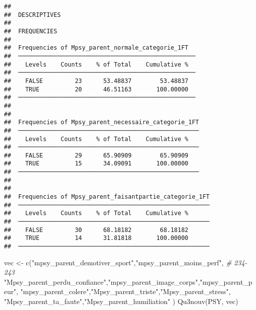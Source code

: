 \documentclass[
]{article}
\newenvironment{Shaded}{\begin{snugshade}}{\end{snugshade}}
\newcommand{\CommentTok}[1]{\textcolor[rgb]{0.56,0.35,0.01}{\textit{#1}}}
\newcommand{\FunctionTok}[1]{\textcolor[rgb]{0.00,0.00,0.00}{#1}}
\newcommand{\NormalTok}[1]{#1}
\newcommand{\OtherTok}[1]{\textcolor[rgb]{0.56,0.35,0.01}{#1}}
\newcommand{\StringTok}[1]{\textcolor[rgb]{0.31,0.60,0.02}{#1}}
\begin{document}
\begin{verbatim}
## 
##  DESCRIPTIVES
## 
##  FREQUENCIES
## 
##  Frequencies of Mpsy_parent_normale_categorie_1FT   
##  ────────────────────────────────────────────────── 
##    Levels    Counts    % of Total    Cumulative %   
##  ────────────────────────────────────────────────── 
##    FALSE         23      53.48837        53.48837   
##    TRUE          20      46.51163       100.00000   
##  ────────────────────────────────────────────────── 
## 
## 
##  Frequencies of Mpsy_parent_necessaire_categorie_1FT 
##  ─────────────────────────────────────────────────── 
##    Levels    Counts    % of Total    Cumulative %   
##  ─────────────────────────────────────────────────── 
##    FALSE         29      65.90909        65.90909   
##    TRUE          15      34.09091       100.00000   
##  ─────────────────────────────────────────────────── 
## 
## 
##  Frequencies of Mpsy_parent_faisantpartie_categorie_1FT 
##  ────────────────────────────────────────────────────── 
##    Levels    Counts    % of Total    Cumulative %   
##  ────────────────────────────────────────────────────── 
##    FALSE         30      68.18182        68.18182   
##    TRUE          14      31.81818       100.00000   
##  ──────────────────────────────────────────────────────
\end{verbatim}

\begin{Shaded}
\begin{Highlighting}[]
\NormalTok{vec }\OtherTok{\textless{}{-}} \FunctionTok{c}\NormalTok{(}\StringTok{"mpsy\_parent\_demotiver\_sport"}\NormalTok{,}\StringTok{"mpsy\_parent\_moins\_perf"}\NormalTok{,         }\CommentTok{\#  234{-}243}
  \StringTok{"Mpsy\_parent\_perdu\_confiance"}\NormalTok{,}\StringTok{"mpsy\_parent\_image\_corps"}\NormalTok{,}\StringTok{"mpsy\_parent\_peur"}\NormalTok{, }
    \StringTok{"mpsy\_parent\_colere"}\NormalTok{,}\StringTok{"Mpsy\_parent\_triste"}\NormalTok{,}\StringTok{"Mpsy\_parent\_stress"}\NormalTok{,}
    \StringTok{"Mpsy\_parent\_ta\_faute"}\NormalTok{,}\StringTok{"Mpsy\_parent\_humiliation"}
\NormalTok{     )}
\FunctionTok{Qu3nouv}\NormalTok{(PSY, vec)}
\end{Highlighting}
\end{Shaded}
\end{document}
